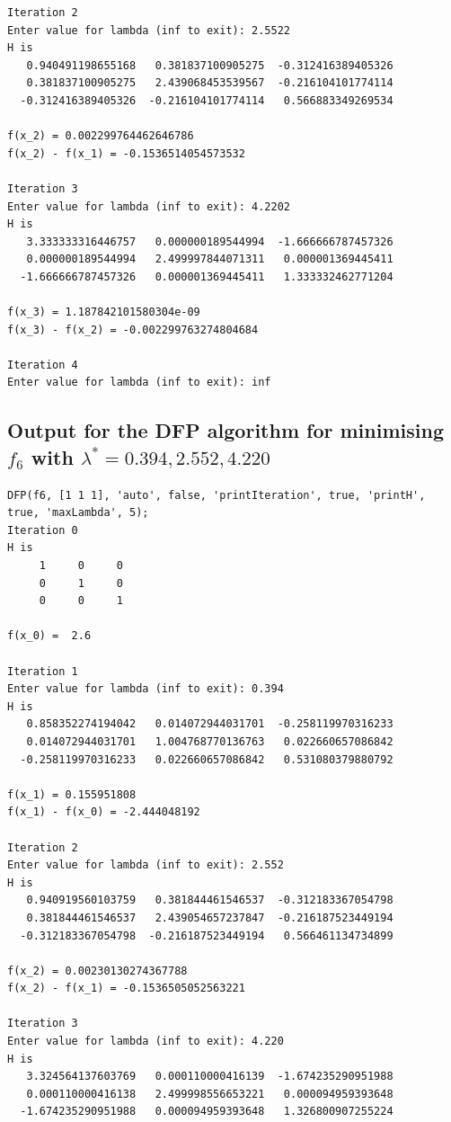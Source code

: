 \documentclass[11pt]{article} %
\begin{document}
\begin{appendices}
\begin{verbatim}
Iteration 2
Enter value for lambda (inf to exit): 2.5522
H is
   0.940491198655168   0.381837100905275  -0.312416389405326
   0.381837100905275   2.439068453539567  -0.216104101774114
  -0.312416389405326  -0.216104101774114   0.566883349269534

f(x_2) = 0.002299764462646786
f(x_2) - f(x_1) = -0.1536514054573532
 
Iteration 3
Enter value for lambda (inf to exit): 4.2202
H is
   3.333333316446757   0.000000189544994  -1.666666787457326
   0.000000189544994   2.499997844071311   0.000001369445411
  -1.666666787457326   0.000001369445411   1.333332462771204

f(x_3) = 1.187842101580304e-09
f(x_3) - f(x_2) = -0.002299763274804684
 
Iteration 4
Enter value for lambda (inf to exit): inf
\end{verbatim}

\subsection{Output for the DFP algorithm for minimising $f_6$ with $\lambda^* = 0.394, 2.552, 4.220$}
\label{app:DFP_out_2}
\begin{verbatim}
DFP(f6, [1 1 1], 'auto', false, 'printIteration', true, 'printH', true, 'maxLambda', 5);
Iteration 0
H is
     1     0     0
     0     1     0
     0     0     1

f(x_0) =  2.6
 
Iteration 1
Enter value for lambda (inf to exit): 0.394
H is
   0.858352274194042   0.014072944031701  -0.258119970316233
   0.014072944031701   1.004768770136763   0.022660657086842
  -0.258119970316233   0.022660657086842   0.531080379880792

f(x_1) = 0.155951808
f(x_1) - f(x_0) = -2.444048192
 
Iteration 2
Enter value for lambda (inf to exit): 2.552
H is
   0.940919560103759   0.381844461546537  -0.312183367054798
   0.381844461546537   2.439054657237847  -0.216187523449194
  -0.312183367054798  -0.216187523449194   0.566461134734899

f(x_2) = 0.00230130274367788
f(x_2) - f(x_1) = -0.1536505052563221
 
Iteration 3
Enter value for lambda (inf to exit): 4.220
H is
   3.324564137603769   0.000110000416139  -1.674235290951988
   0.000110000416138   2.499998556653221   0.000094959393648
  -1.674235290951988   0.000094959393648   1.326800907255224


\end{verbatim}
\end{appendices}
\end{document}
